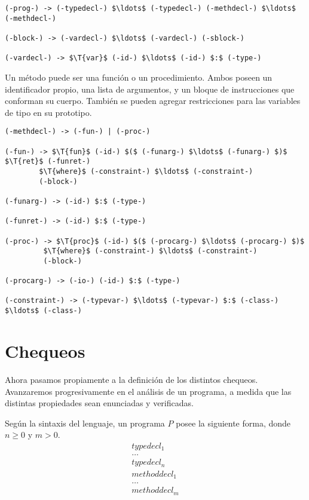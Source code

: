 \documentclass{article}
\begin{document}

\begin{lstlisting}[style = syntax]
(-prog-) -> (-typedecl-) $\ldots$ (-typedecl-) (-methdecl-) $\ldots$ (-methdecl-)

(-block-) -> (-vardecl-) $\ldots$ (-vardecl-) (-sblock-)

(-vardecl-) -> $\T{var}$ (-id-) $\ldots$ (-id-) $:$ (-type-)
\end{lstlisting}

Un método puede ser una función o un procedimiento.
Ambos poseen un identificador propio, una lista de argumentos, y un bloque de instrucciones que conforman su cuerpo.
También se pueden agregar restricciones para las variables de tipo en su prototipo.

\begin{lstlisting}[style = syntax]
(-methdecl-) -> (-fun-) | (-proc-)

(-fun-) -> $\T{fun}$ (-id-) $($ (-funarg-) $\ldots$ (-funarg-) $)$ $\T{ret}$ (-funret-)
        $\T{where}$ (-constraint-) $\ldots$ (-constraint-)
        (-block-)

(-funarg-) -> (-id-) $:$ (-type-)

(-funret-) -> (-id-) $:$ (-type-)

(-proc-) -> $\T{proc}$ (-id-) $($ (-procarg-) $\ldots$ (-procarg-) $)$
         $\T{where}$ (-constraint-) $\ldots$ (-constraint-)
         (-block-)

(-procarg-) -> (-io-) (-id-) $:$ (-type-)

(-constraint-) -> (-typevar-) $\ldots$ (-typevar-) $:$ (-class-) $\ldots$ (-class-)
\end{lstlisting}

\section{Chequeos}

Ahora pasamos propiamente a la definición de los distintos chequeos.
Avanzaremos progresivamente en el análisis de un programa, a medida que las distintas propiedades sean enunciadas y verificadas.

Según la sintaxis del lenguaje, un programa $P$ posee la siguiente forma, donde $n \geq 0$ y $m > 0$.
\begin{gather*}
typedecl_1 \\
\ldots \\
typedecl_n \\
methoddecl_1 \\
\ldots \\
methoddecl_m
\end{gather*}
\end{document}
